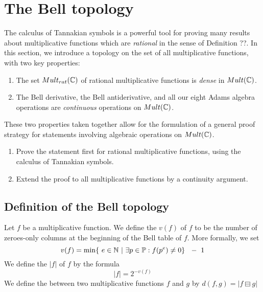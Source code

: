 
\section{The Bell topology}  \label{sec:BellTopology}

The calculus of Tannakian symbols is a powerful tool for proving many results about multiplicative functions which are \emph{rational} in the sense of Definition ??. In this section, we introduce a topology on the set of all multiplicative functions, with two key properties:
\begin{enumerate}
\item The set $Mult_{rat}(\mathbb{C})$ of rational multiplicative functions is \emph{dense} in $Mult(\mathbb{C})$.
\item The Bell derivative, the Bell antiderivative, and all our eight Adams algebra operations are \emph{continuous} operations on $Mult(\mathbb{C})$. 

\end{enumerate}

These two properties taken together allow for the formulation of a general proof strategy for statements involving algebraic operations on $Mult(\mathbb{C})$.
\begin{enumerate}
\item Prove the statement first for rational multiplicative functions, using the calculus of Tannakian symbols.
\item Extend the proof to all multiplicative functions by a continuity argument.
\end{enumerate} 

\subsection{Definition of the Bell topology}


\begin{definition}
Let $f$ be a multiplicative function. We define the  $v(f)$ of $f$ to be the number of zeroes-only columns at the beginning of the Bell table of $f$. More formally, we set 
$$  v(f) = \min \{ \ e \in \N \ \vert \ \exists p \in \mathbb{P}:  f(p^e) \neq 0 \} \ \ - \ 1   $$
We define the  $\vert  f \vert$ of $f$ by the formula
$$  \vert f \vert = 2^{-v(f)}  $$
We define the  between two multiplicative functions $f$ and $g$ by
$d(f, g) = \vert   f \boxminus g \vert$
\end{definition}


